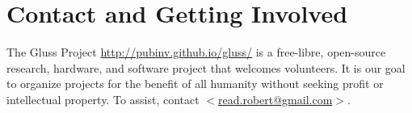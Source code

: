 \documentclass[11pt]{article}
\begin{document}
\section{Contact and Getting Involved}

The Gluss Project \url{http://pubinv.github.io/gluss/}
is a free-libre, open-source research, hardware, and software project that welcomes volunteers.
It is our goal to organize projects for the benefit of all humanity without seeking profit or intellectual property.
To assist, contact \href{mailto:read.robert@gmail.com}{$<$read.robert@gmail.com$>$}.



\end{document}
